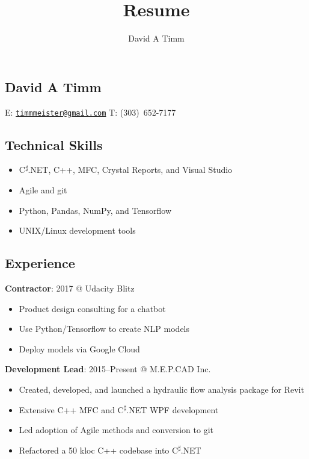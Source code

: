 \documentclass[letterpaper,12pt]{article}
\author{David A Timm}
\title{Resume}
\begin{document}
\begin{center}
\section{David A Timm}

E: \href{mailto:timmmeister@gmail.com?subject=You%27re%20hired!}
{\nolinkurl{timmmeister@gmail.com}}
T: \mbox{(303) 652-7177}
\end{center}

\begin{center}
\subsection{Technical Skills}
\end{center}

\begin{itemize}
\item C\textsuperscript{{$\sharp$}}.NET, C++, MFC, Crystal Reports, and Visual Studio
\item Agile and git
\item Python, Pandas, NumPy, and Tensorflow
\item UNIX/Linux development tools
\end{itemize}

\begin{center}
\subsection{Experience}
\end{center}

\begin{flushleft}
\textbf{Contractor}: 2017 @ Udacity Blitz
\end{flushleft}

\begin{itemize}
\item Product design consulting for a chatbot
\item Use Python/Tensorflow to create NLP models
\item Deploy models via Google Cloud
\end{itemize}

\begin{flushleft}
\textbf{Development Lead}: 2015--Present @ M.E.P.CAD Inc.
\end{flushleft}

\begin{itemize}
\item Created, developed, and launched a hydraulic flow analysis package for Revit
\item Extensive C++ MFC and C\textsuperscript{{$\sharp$}}.NET WPF development
\item Led adoption of Agile methods and conversion to git
\item Refactored a 50 kloc C++ codebase into C\textsuperscript{{$\sharp$}}.NET
\end{itemize}
\end{document}

